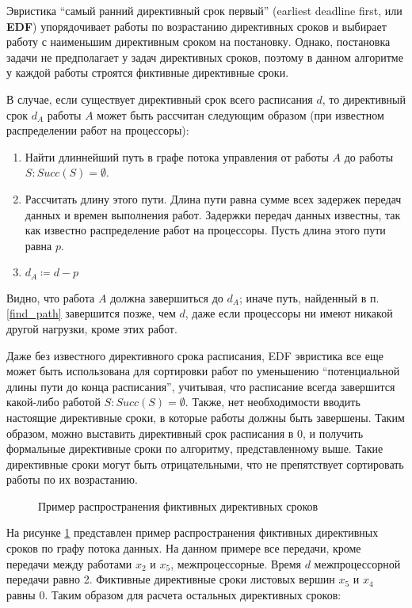 Эвристика ``самый ранний директивный срок первый'' (earliest deadline first, или \textbf{EDF}) упорядочивает работы по возрастанию директивных сроков и выбирает работу с наименьшим директивным сроком на постановку. Однако, постановка задачи не предполагает у задач директивных сроков, поэтому в данном алгоритме у каждой работы строятся фиктивные директивные сроки.

В случае, если существует директивный срок всего расписания $d$, то директивный срок $d_A$ работы $A$ может быть рассчитан следующим образом (при известном распределении работ на процессоры):
\begin{enumerate}
    \item \label{find_path} Найти длиннейший путь в графе потока управления от работы $A$ до работы $S: Succ(S) = \emptyset$.
    \item Рассчитать длину этого пути. Длина пути равна сумме всех задержек передач данных и времен выполнения работ. Задержки передач данных известны, так как известно распределение работ на процессоры. Пусть длина этого пути равна $p$.
    \item $d_A \coloneqq d - p$
\end{enumerate}
Видно, что работа $A$ должна завершиться до $d_A$; иначе путь, найденный в п.\ref{find_path} завершится позже, чем $d$, даже если процессоры ни имеют никакой другой нагрузки, кроме этих работ.

Даже без известного директивного срока расписания, EDF эвристика все еще может быть использована для сортировки работ по уменьшению ``потенциальной длины пути  до конца расписания'', учитывая, что расписание всегда завершится какой-либо работой $S : Succ(S) = \emptyset$. Также, нет необходимости вводить настоящие директивные сроки, в которые работы должны быть завершены. Таким образом, можно выставить директивный срок расписания в $0$, и получить формальные директивные сроки по алгоритму, представленному выше. Такие директивные сроки могут быть отрицательными, что не препятствует сортировать работы по их возрастанию.

\begin{figure}[!htbp]
    \caption{Пример распространения фиктивных директивных сроков}
    \label{fig:edf}
\end{figure}

На рисунке \ref{fig:edf} представлен пример распространения фиктивных директивных сроков по графу потока данных. На данном примере все передачи, кроме передачи между работами $x_2$ и $x_5$, межпроцессорные. Время $d$ межпроцессорной передачи равно 2. Фиктивные директивные сроки листовых вершин $x_5$ и $x_4$ равны 0. Таким образом для расчета остальных директивных сроков:

